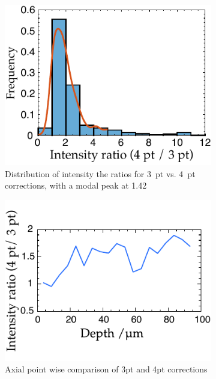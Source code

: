 \begin{figure}
	\centering
    \begin{subfigure}[t]{0.45\textwidth}
        \centering
        \includegraphics{in_situ/histogramofIntensityRatios_thesis}
        \caption{Distribution of intensity the ratios for 3~pt vs. 4~pt corrections, with a modal peak at 1.42}
        \label{fig:in_situ/histogramofIntensityRatios_thesis}
    \end{subfigure}
    \hfill
    \begin{subfigure}[t]{0.45\textwidth}
        \centering
        \includegraphics{in_situ/beadComparisonAxial_thesis}
        \caption{Axial point wise comparison of 3pt and 4pt corrections}
        \label{fig:in_situ/beadComparisonAxial_thesis}
    \end{subfigure}\vspace{0.05\textheight}
    \begin{subfigure}[t]{0.45\textwidth}

\end{subfigure}
\end{figure}
